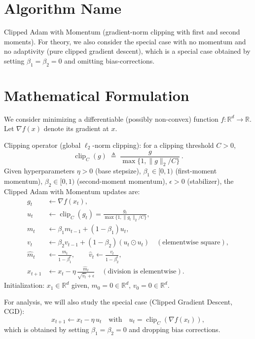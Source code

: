 \documentclass[11pt]{article}
\newcommand{\R}{\mathbb{R}}
\begin{document}
\section*{Algorithm Name}
Clipped Adam with Momentum (gradient-norm clipping with first and second moments). For theory, we also consider the special case with no momentum and no adaptivity (pure clipped gradient descent), which is a special case obtained by setting $\beta_1=\beta_2=0$ and omitting bias-corrections.

\section*{Mathematical Formulation}
We consider minimizing a differentiable (possibly non-convex) function $f:\R^d \to \R$. Let $\nabla f(x)$ denote its gradient at $x$.

Clipping operator (global $\ell_2$-norm clipping): for a clipping threshold $C>0$,
\[
\operatorname{clip}_C(g) \;\triangleq\; \frac{g}{\max\{1,\|g\|_2/C\}} \,.
\]
Given hyperparameters $\eta>0$ (base stepsize), $\beta_1\in[0,1)$ (first-moment momentum), $\beta_2\in[0,1)$ (second-moment momentum), $\epsilon>0$ (stabilizer), the Clipped Adam with Momentum updates are:
\begin{align*}
g_t &\leftarrow \nabla f(x_t), \\
u_t &\leftarrow \operatorname{clip}_C(g_t) = \frac{g_t}{\max\{1,\|g_t\|_2/C\}}, \\
m_t &\leftarrow \beta_1 m_{t-1} + (1-\beta_1) u_t, \\
v_t &\leftarrow \beta_2 v_{t-1} + (1-\beta_2) (u_t \odot u_t) \quad (\text{elementwise square}), \\
\hat{m}_t &\leftarrow \frac{m_t}{1-\beta_1^t}, \qquad
\hat{v}_t \leftarrow \frac{v_t}{1-\beta_2^t}, \\
x_{t+1} &\leftarrow x_t - \eta \, \frac{\hat{m}_t}{\sqrt{\hat{v}_t} + \epsilon} \quad (\text{division is elementwise}).
\end{align*}
Initialization: $x_1\in\R^d$ given, $m_0=0\in\R^d$, $v_0=0\in\R^d$.

For analysis, we will also study the special case (Clipped Gradient Descent, CGD):
\[
x_{t+1} \leftarrow x_t - \eta \, u_t \quad \text{with} \quad u_t=\operatorname{clip}_C(\nabla f(x_t)),
\]
which is obtained by setting $\beta_1=\beta_2=0$ and dropping bias corrections.
\end{document}
